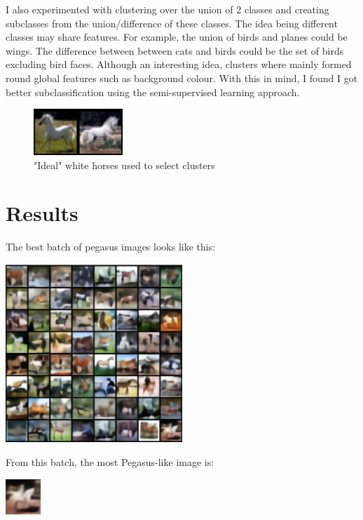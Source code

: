 \documentclass{article}
\begin{document}
I also experimented with clustering over the union of 2 classes and creating subclasses from the union/difference of these classes. The idea being different classes may share features. For example, the union of birds and planes could be wings. The difference between between cats and birds could be the set of birds excluding bird faces. Although an interesting idea, clusters where mainly formed round global features such as background colour. With this in mind, I found I got better subclassification using the semi-supervised learning approach.

\begin{figure}
    \begin{center}
        \includegraphics[width=0.3\textwidth]{figures/good_horses_cropped.png}
    \end{center}
    \caption{"Ideal" white horses used to select clusters}
    \label{fig:good_horses}
\end{figure}

\section{Results}
The best batch of pegasus images looks like this:
\begin{center}
    \includegraphics[width=0.5\textwidth]{figures/64_cropped.png}
\end{center}
From this batch, the most Pegasus-like image is:
\begin{center}
    \includegraphics[width=0.1\textwidth]{figures/1_cropped.png}
\end{center}
\end{document}
